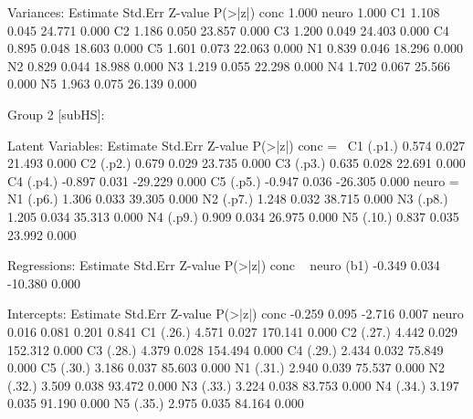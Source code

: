 \begin{Schunk}
\begin{Soutput}
Variances:
                   Estimate  Std.Err  Z-value  P(>|z|)
    conc              1.000                           
    neuro             1.000                           
    C1                1.108    0.045   24.771    0.000
    C2                1.186    0.050   23.857    0.000
    C3                1.200    0.049   24.403    0.000
    C4                0.895    0.048   18.603    0.000
    C5                1.601    0.073   22.063    0.000
    N1                0.839    0.046   18.296    0.000
    N2                0.829    0.044   18.988    0.000
    N3                1.219    0.055   22.298    0.000
    N4                1.702    0.067   25.566    0.000
    N5                1.963    0.075   26.139    0.000


Group 2 [subHS]:

Latent Variables:
                   Estimate  Std.Err  Z-value  P(>|z|)
  conc =~                                             
    C1      (.p1.)    0.574    0.027   21.493    0.000
    C2      (.p2.)    0.679    0.029   23.735    0.000
    C3      (.p3.)    0.635    0.028   22.691    0.000
    C4      (.p4.)   -0.897    0.031  -29.229    0.000
    C5      (.p5.)   -0.947    0.036  -26.305    0.000
  neuro =~                                            
    N1      (.p6.)    1.306    0.033   39.305    0.000
    N2      (.p7.)    1.248    0.032   38.715    0.000
    N3      (.p8.)    1.205    0.034   35.313    0.000
    N4      (.p9.)    0.909    0.034   26.975    0.000
    N5      (.10.)    0.837    0.035   23.992    0.000

Regressions:
                   Estimate  Std.Err  Z-value  P(>|z|)
  conc ~                                              
    neuro     (b1)   -0.349    0.034  -10.380    0.000

Intercepts:
                   Estimate  Std.Err  Z-value  P(>|z|)
    conc             -0.259    0.095   -2.716    0.007
    neuro             0.016    0.081    0.201    0.841
    C1      (.26.)    4.571    0.027  170.141    0.000
    C2      (.27.)    4.442    0.029  152.312    0.000
    C3      (.28.)    4.379    0.028  154.494    0.000
    C4      (.29.)    2.434    0.032   75.849    0.000
    C5      (.30.)    3.186    0.037   85.603    0.000
    N1      (.31.)    2.940    0.039   75.537    0.000
    N2      (.32.)    3.509    0.038   93.472    0.000
    N3      (.33.)    3.224    0.038   83.753    0.000
    N4      (.34.)    3.197    0.035   91.190    0.000
    N5      (.35.)    2.975    0.035   84.164    0.000


\end{Soutput}
\end{Schunk}
